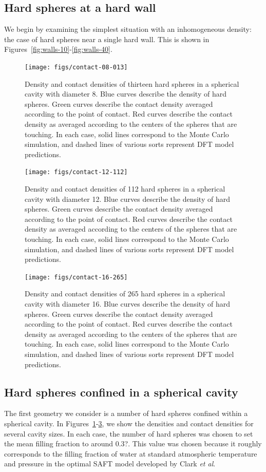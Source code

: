 \documentclass[letterpaper,twocolumn,amsmath,amssymb,jcp,10pt,aip]{revtex4-1}
\begin{document}
\subsection{Hard spheres at a hard wall}

We begin by examining the simplest situation with an inhomogeneous
density:  the case of hard spheres near a single hard wall.  This is
shown in Figures~\ref{fig:walls-10}-\ref{fig:walls-40}.



\newcommand\sphereExplanation{ Blue curves describe the density of
  hard spheres.  Green curves describe the contact density averaged
  according to the point of contact.  Red curves describe the contact
  density as averaged according to the centers of the spheres that are
  touching.  In each case, solid lines correspond to the Monte Carlo
  simulation, and dashed lines of various sorts represent DFT model
  predictions.  }

\begin{figure}
  \texttt{[image: figs/contact-08-013]}
  \caption{Density and contact densities of thirteen hard spheres in a
    spherical cavity with diameter 8. \sphereExplanation }
  \label{fig:sphere-8}
\end{figure}

\begin{figure}
  \texttt{[image: figs/contact-12-112]}
  \caption{Density and contact densities of 112 hard spheres in a
    spherical cavity with diameter 12.  \sphereExplanation}
  \label{fig:sphere-12}
\end{figure}

\begin{figure}
  \texttt{[image: figs/contact-16-265]}
  \caption{Density and contact densities of 265 hard spheres in a
    spherical cavity with diameter 16. \sphereExplanation}
  \label{fig:sphere-16}
\end{figure}

\subsection{Hard spheres confined in a spherical cavity}

The first geometry we consider is a number of hard spheres confined
within a spherical cavity.  In
Figures~\ref{fig:sphere-8}-\ref{fig:sphere-16}, we show
the densities and contact densities for several cavity sizes.  In each
case, the number of hard spheres was chosen to set the mean filling
fraction to around 0.3?.  This value was chosen because it roughly
corresponds to the filling fraction of water at standard atmospheric
temperature and pressure in the optimal SAFT model developed by Clark
\emph{et al}\cite{clark2006developing}.
\end{document}
